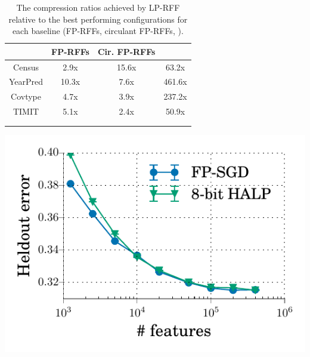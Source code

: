 \begin{table}[ht]
\begin{minipage}{.54\linewidth}
\centering
\vspace{0.3in}
	\begin{tabular}{c c c c}
		\toprule
		& FP-RFFs & Cir. FP-RFFs & \Nystrom \\
		\midrule
		Census & 2.9x & 15.6x & 63.2x \\
		YearPred & 10.3x & 7.6x & 461.6x \\ 
		Covtype & 4.7x & 3.9x & 237.2x \\ 
		TIMIT & 5.1x & 2.4x & 50.9x \\ 
		\bottomrule \\ \\
	\end{tabular}
	\caption{The compression ratios achieved by LP-RFF relative to the best performing configurations for each baseline (FP-RFFs, circulant FP-RFFs, \NystromNS). 
	}
	\label{tab:mem_saving}
\end{minipage}
\hspace{0.22in}
\begin{minipage}{0.4\linewidth}
	\includegraphics[width=\linewidth]{figures/timit_error_vs_n_feat_lm_halp.pdf}

\end{minipage}
\end{table}
